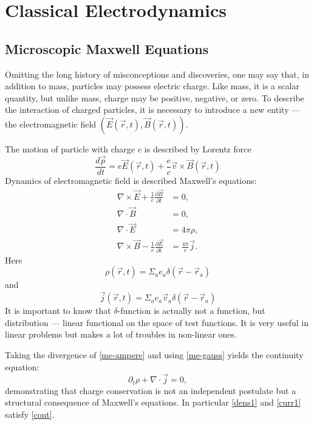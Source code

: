 \chapter{Classical Electrodynamics}
\label{class-ed}
\section{Microscopic Maxwell Equations}
\label{micro-maxwell-eqs}

Omitting the long history of misconceptions and discoveries, 
one may say that, in addition to mass, particles may possess 
electric charge. Like mass, it is a scalar quantity, but unlike mass, 
charge may be positive, negative, or zero.
To describe the interaction of charged particles, 
it is necessary to introduce a new entity --- the electromagnetic field $ (\vec E(\vec r,t),\vec B(\vec r,t)) $.

The motion of  particle with charge $ e $ is described by Lorentz force
\begin{equation}
   \label {lorentz-force}
   \frac{d \vec p}{d t}=e \vec E(\vec r,t) + \frac{e}{c}\vec v \times \vec B(\vec r,t)
\end{equation}
Dynamics of electromagnetic field is described   Maxwell’s equations:
\begin{align}
\nabla \times \vec{E} + \frac{1}{c}\frac{\partial \vec{B}}{\partial t} &= 0, \label{me-faraday} \\
\nabla \cdot \vec{B} &= 0, \label{me-monopole} \\
\nabla \cdot \vec{E} &= 4\pi \rho, \label{me-gauss} \\
\nabla \times \vec{B} - \frac{1}{c}\frac{\partial \vec{E}}{\partial t} &= \frac{4\pi}{c}\vec{j}. \label{me-ampere}
\end{align}
Here 
\begin{equation}
   \label {dens1}
    \rho(\vec r,t)=\Sigma_a e_a \delta (\vec r-\vec r_a)
\end{equation}
and
\begin{equation}
   \label {curr1}
    \vec j(\vec r,t)=\Sigma_a e_a \vec v_a \delta (\vec r-\vec r_a)
\end{equation}
It is important to know that $ \delta $-function is actually not a function, but distribution
--- linear functional on the space of test functions. It is very useful in linear problems
but makes a lot of troubles in non-linear ones.

Taking the divergence of \eqref{me-ampere} and using \eqref{me-gauss} yields the continuity equation:
\begin{equation}
    \label{cont}
\partial_t \rho + \nabla \cdot \vec{j} = 0,
\end{equation}
demonstrating that charge conservation is not an independent 
postulate but a structural consequence of Maxwell’s equations.
In particular \eqref{dens1} and \eqref{curr1} satisfy \eqref{cont}.

